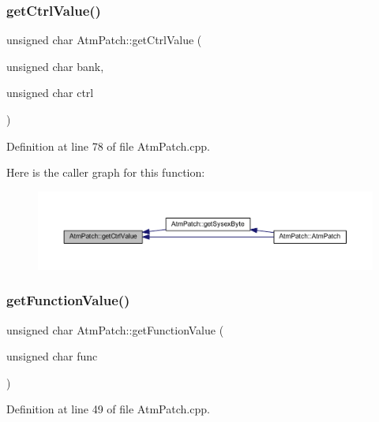 \subsubsection{\texorpdfstring{get\+Ctrl\+Value()}{getCtrlValue()}}
{\footnotesize\ttfamily unsigned char Atm\+Patch\+::get\+Ctrl\+Value (\begin{DoxyParamCaption}\item[{unsigned char}]{bank,  }\item[{unsigned char}]{ctrl }\end{DoxyParamCaption})}



Definition at line 78 of file Atm\+Patch.\+cpp.

Here is the caller graph for this function\+:
\nopagebreak
\begin{figure}[H]
\begin{center}
\leavevmode
\includegraphics[width=350pt]{d9/de1/class_atm_patch_a5e8835fb80bdd1f130f129edde447d35_icgraph}
\end{center}
\end{figure}
\mbox{\label{class_atm_patch_a7b4184a7f5bd314e150f9ad38cc3a0fb}} 
\subsubsection{\texorpdfstring{get\+Function\+Value()}{getFunctionValue()}}
{\footnotesize\ttfamily unsigned char Atm\+Patch\+::get\+Function\+Value (\begin{DoxyParamCaption}\item[{unsigned char}]{func }\end{DoxyParamCaption})}



Definition at line 49 of file Atm\+Patch.\+cpp.

